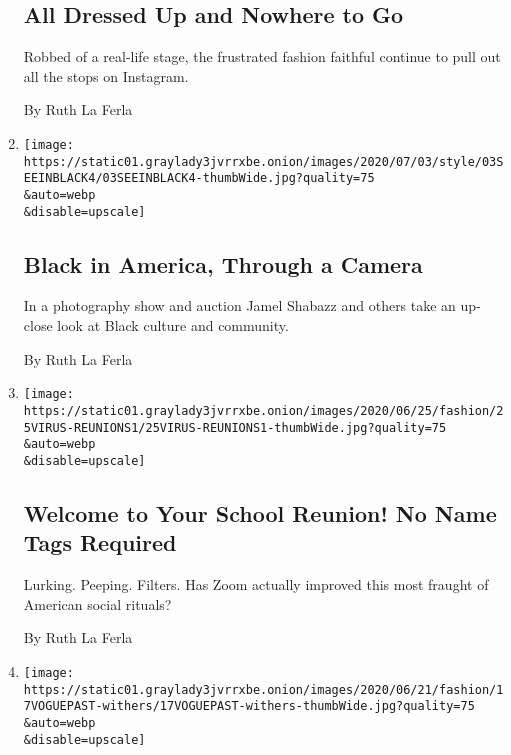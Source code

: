 \begin{enumerate}
  \hypertarget{all-dressed-up-and-nowhere-to-go}{%
  \subsection{All Dressed Up and Nowhere to
  Go}\label{all-dressed-up-and-nowhere-to-go}}

  Robbed of a real-life stage, the frustrated fashion faithful continue
  to pull out all the stops on Instagram.

  By Ruth La Ferla
\item
  \href{/2020/07/04/style/black-in-america-through-a-camera.html}{}

  \texttt{[image: https://static01.graylady3jvrrxbe.onion/images/2020/07/03/style/03SEEINBLACK4/03SEEINBLACK4-thumbWide.jpg?quality=75\\\&auto=webp\\\&disable=upscale]}

  \hypertarget{black-in-america-through-a-camera}{%
  \subsection{Black in America, Through a
  Camera}\label{black-in-america-through-a-camera}}

  In a photography show and auction Jamel Shabazz and others take an
  up-close look at Black culture and community.

  By Ruth La Ferla
\item
  \href{/2020/06/27/style/school-reunions-on-zoom.html}{}

  \texttt{[image: https://static01.graylady3jvrrxbe.onion/images/2020/06/25/fashion/25VIRUS-REUNIONS1/25VIRUS-REUNIONS1-thumbWide.jpg?quality=75\\\&auto=webp\\\&disable=upscale]}

  \hypertarget{welcome-to-your-school-reunion-no-name-tags-required}{%
  \subsection{Welcome to Your School Reunion! No Name Tags
  Required}\label{welcome-to-your-school-reunion-no-name-tags-required}}

  Lurking. Peeping. Filters. Has Zoom actually improved this most
  fraught of American social rituals?

  By Ruth La Ferla
\item
  \href{/2020/06/18/style/vogue-editor-england-audrey-withers-biography-dressed-for-war.html}{}

  \texttt{[image: https://static01.graylady3jvrrxbe.onion/images/2020/06/21/fashion/17VOGUEPAST-withers/17VOGUEPAST-withers-thumbWide.jpg?quality=75\\\&auto=webp\\\&disable=upscale]}


\end{enumerate}
